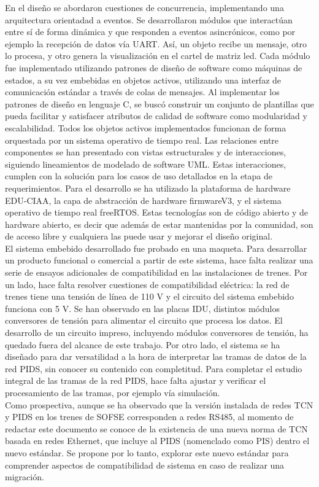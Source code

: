 En el diseño se abordaron cuestiones de concurrencia, implementando una arquitectura orientadad a eventos. Se desarrollaron módulos que interactúan entre sí de forma dinámica y que responden a eventos asincrónicos, como por ejemplo la recepción de datos vía UART. Así, un objeto recibe un mensaje, otro lo procesa, y otro genera la visualización en el cartel de matriz led. Cada módulo fue implementado utilizando patrones de diseño de software como máquinas de estados, a su vez embebidas en objetos activos, utilizando una interfaz de comunicación estándar a través de colas de mensajes.  Al implementar los patrones de diseño en lenguaje C, se buscó construir un conjunto de plantillas que pueda facilitar y satisfacer atributos de calidad de software como modularidad y escalabilidad. Todos los objetos activos implementados funcionan de forma orquestada por un sistema operativo de tiempo real. Las relaciones entre componentes se han presentado con vistas estructurales y de interacciones, siguiendo lineamientos de modelado de software UML. Estas interacciones, cumplen con la solución para los casos de uso detallados en la etapa de requerimientos. Para el desarrollo se ha utilizado la plataforma de hardware EDU-CIAA, la capa de abstracción de hardware firmwareV3, y el sistema operativo de tiempo real freeRTOS. Estas tecnologías son de código abierto y de hardware abierto, es decir que además de estar mantenidas por la comunidad, son de acceso libre y cualquiera las puede usar y mejorar el diseño original. \\


El sistema embebido desarrollado fue probado en una maqueta. Para desarrollar un producto funcional o comercial a partir de este sistema, hace falta realizar una serie de ensayos adicionales de compatibilidad en las instalaciones de trenes. Por un lado, hace falta resolver cuestiones de compatibilidad eléctrica: la red de trenes tiene una tensión de línea de 110 V y el circuito del sistema embebido funciona con 5 V. Se han observado en las placas IDU, distintos módulos conversores de tensión para alimentar el circuito que procesa los datos. El desarrollo de un circuito impreso, incluyendo módulos conversores de tensión, ha quedado fuera del alcance de este trabajo. Por otro lado, el sistema se ha diseñado para dar versatilidad a la hora de interpretar las tramas de datos de la red PIDS, sin conocer su contenido con completitud. Para completar el estudio integral de las tramas de la red PIDS, hace falta ajustar y verificar el procesamiento de las tramas, por ejemplo vía simulación.\\


Como prospectiva, aunque se ha observado que la versión instalada de redes TCN y PIDS en los trenes de SOFSE corresponden a redes RS485, al momento de redactar este documento se conoce de la existencia de una nueva norma de TCN basada en redes Ethernet, que incluye al PIDS (nomenclado como PIS) dentro el nuevo estándar. Se propone por lo tanto, explorar este nuevo estándar para comprender aspectos de compatibilidad de sistema en caso de realizar una migración.\\